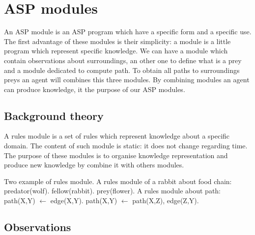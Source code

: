 \documentclass{aamas2012}
\begin{document}
\section{ASP modules}

	An ASP module is an ASP program which have a specific form and a specific use.
	The first advantage of these modules is their simplicity: a module is a little program which represent specific knowledge.
	We can have a module which contain observations about surroundings,
	an other one to define what is a prey and a module dedicated to compute path.
	To obtain all paths to surroundings preys an agent will combines this three modules.
	By combining modules an agent can produce knowledge, it the purpose of our ASP modules.

\subsection{Background theory}

	\begin{definition}
		A rules module is a set of rules which represent knowledge about a specific domain.
		The content of such module is static: it does not change regarding time.
		The purpose of these modules is to organise knowledge representation and produce
		new knowledge by combine it with others modules.
	\end{definition}
	
	\begin{example}
		Two example of rules module.\newline
		A rules module of a rabbit about food chain:\newline
		\newline
		predator(wolf).\newline
		fellow(rabbit).\newline
		prey(flower).\newline
		\newline
		A rules module about path:\newline
		\newline
		path(X,Y) $\leftarrow$ edge(X,Y).\newline
		path(X,Y) $\leftarrow$ path(X,Z), edge(Z,Y).
	\end{example}

\subsection{Observations}
\end{document}
